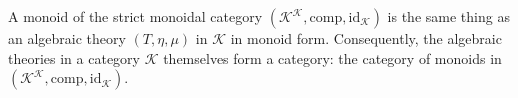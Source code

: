 A monoid of the strict monoidal category $(\mathcal{K}^\mathcal{K}, \mathrm{comp}, \mathrm{id}_\mathcal{K})$ is the same thing as an algebraic theory $(T, \eta, \mu)$ in $\mathcal{K}$ in monoid form. Consequently, the algebraic theories in a category $\mathcal{K}$ themselves form a category: the category of monoids in $(\mathcal{K}^\mathcal{K}, \mathrm{comp}, \mathrm{id}_\mathcal{K})$.
